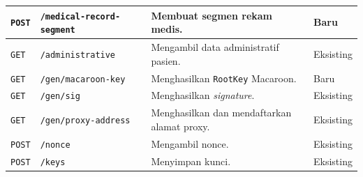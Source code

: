 {\begin{longtable}{|p{}|p{}|p{}|p{}|}
		\texttt{POST}   & \texttt{/medical-\allowbreak record-\allowbreak segment}
		                & Membuat segmen rekam medis.
		                & Baru                                                                                           \\ \hline


		\texttt{GET}    & \texttt{/administrative}
		                & Mengambil data administratif pasien.
		                & Eksisting                                                                                      \\ \hline


		\texttt{GET}    & \texttt{/gen/\allowbreak macaroon-\allowbreak key}
		                & Menghasilkan \texttt{RootKey} Macaroon.
		                & Baru                                                                                           \\ \hline

		\texttt{GET}    & \texttt{/gen/sig}
		                & Menghasilkan \textit{signature}.
		                & Eksisting                                                                                      \\ \hline

		\texttt{GET}    & \texttt{/gen/\allowbreak proxy-\allowbreak address}
		                & Menghasilkan dan mendaftarkan alamat proxy.
		                & Eksisting                                                                                      \\ \hline

		\texttt{POST}   & \texttt{/nonce}
		                & Mengambil nonce.
		                & Eksisting                                                                                      \\ \hline

		\texttt{POST}   & \texttt{/keys}
		                & Menyimpan kunci.
		                & Eksisting                                                                                      \\ \hline


\end{longtable}}
